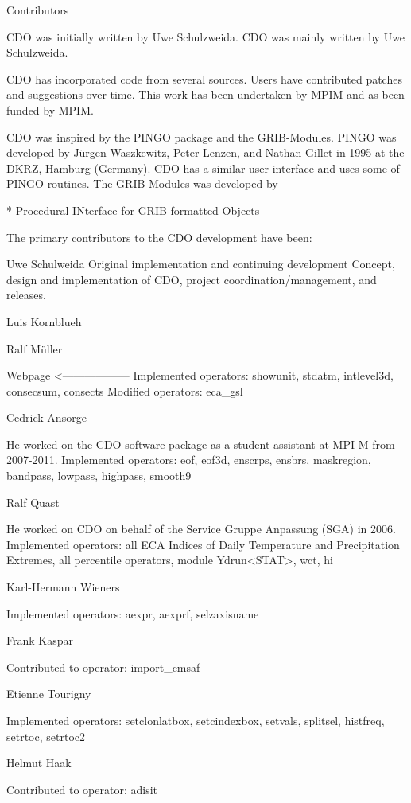 Contributors

CDO was initially written by Uwe Schulzweida.
CDO was mainly written by Uwe Schulzweida.

CDO has incorporated code from several sources. Users have contributed patches and suggestions over time. This work has been undertaken by MPIM and as been funded by MPIM.


CDO was inspired by the PINGO package and the GRIB-Modules. 
PINGO was developed by Jürgen Waszkewitz, Peter Lenzen, and Nathan Gillet in 1995 at the DKRZ, Hamburg (Germany).
CDO has a similar user interface and uses some of PINGO routines.
The GRIB-Modules was developed by 


* Procedural INterface for GRIB formatted Objects


The primary contributors to the CDO development have been: 

Uwe Schulweida
Original implementation and continuing development
Concept, design and implementation of CDO, project coordination/management, and releases.

Luis Kornblueh

Ralf Müller

Webpage <------------------
Implemented operators: showunit, stdatm, intlevel3d, consecsum, consects
Modified operators: eca_gsl

Cedrick Ansorge

He worked on the CDO software package as a student assistant at MPI-M from 2007-2011.
Implemented operators: eof, eof3d, enscrps, ensbrs, maskregion,
bandpass, lowpass, highpass, smooth9

Ralf Quast

He worked on CDO on behalf of the Service Gruppe Anpassung (SGA) in 2006.
Implemented operators: all ECA Indices of Daily Temperature and
Precipitation Extremes, all percentile operators, module Ydrun<STAT>,
wct, hi

Karl-Hermann Wieners

Implemented operators: aexpr, aexprf, selzaxisname

Frank Kaspar

Contributed to operator: import_cmsaf

Etienne Tourigny

Implemented operators: setclonlatbox, setcindexbox, setvals, splitsel, histfreq, setrtoc, setrtoc2

Helmut Haak

Contributed to operator: adisit

